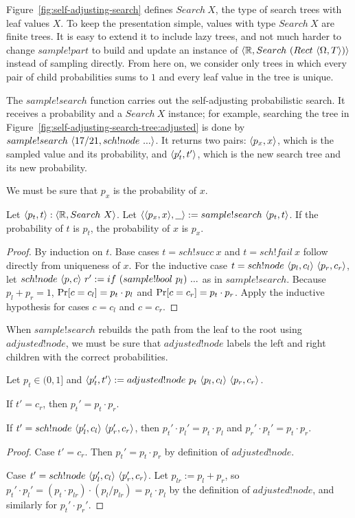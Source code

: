 Figure~\ref{fig:self-adjusting-search} defines $Search~X$, the type of search trees with leaf values $X$.
To keep the presentation simple, values with type $Search~X$ are finite trees.
It is easy to extend it to include lazy trees, and not much harder to change $sample!part$ to build and update an instance of $\langle{\mathbb{R},Search~(Rect~\langle{\Omega,T}\rangle)}\rangle$ instead of sampling directly.
From here on, we consider only trees in which every pair of child probabilities sums to $1$ and every leaf value in the tree is unique.

The $sample!search$ function carries out the self-adjusting probabilistic search.
It receives a probability and a $Search~X$ instance; for example, searching the tree in Figure~\ref{fig:self-adjusting-search-tree:adjusted} is done by $sample!search~\langle{17{/}21,sch!node~...}\rangle$.
It returns two pairs: $\langle{p_x,x}\rangle$, which is the sampled value and its probability, and $\langle{p_t',t'}\rangle$, which is the new search tree and its new probability.

We must be sure that $p_x$ is the probability of $x$.

\begin{theorem}
Let $\langle{p_t,t}\rangle : \langle{\mathbb{R},Search~X}\rangle$.
Let $\langle{\langle{p_x,x}\rangle,\underbar{ }\underbar{ }}\rangle := sample!search~\langle{p_t,t}\rangle$.
If the probability of $t$ is $p_t$, the probability of $x$ is $p_x$.
\end{theorem}
\begin{proof}
By induction on $t$. Base cases $t = sch!succ~x$ and $t = sch!fail~x$ follow directly from uniqueness of $x$.
For the inductive case $t = sch!node~\langle{p_l,c_l}\rangle~\langle{p_r,c_r}\rangle$, let $sch!node~\langle{p,c}\rangle~r' := if~(sample!bool~p_l)~...$ as in $sample!search$.
Because $p_l + p_r = 1$, $\mathrm{Pr}\!\left[{c = c_l}\right] = p_t \cdot p_l$ and $\mathrm{Pr}\!\left[{c = c_r}\right] = p_t \cdot p_r$.
Apply the inductive hypothesis for cases $c = c_l$ and $c = c_r$.
\end{proof}

When $sample!search$ rebuilds the path from the leaf to the root using $adjusted!node$, we must be sure that $adjusted!node$ labels the left and right children with the correct probabilities.

\begin{theorem}
\label{thm:adjusted-node-correct}
Let $p_t \in (0,1]$ and $\langle{p_t',t'}\rangle := adjusted!node~p_t~\langle{p_l,c_l}\rangle~\langle{p_r,c_r}\rangle$.

If $t' = c_r$, then $p_t' = p_t \cdot p_r$.

If $t' = sch!node~\langle{p_l',c_l}\rangle~\langle{p_r',c_r}\rangle$, then $p_t' \cdot p_l' = p_t \cdot p_l$ and $p_r' \cdot p_t' = p_t \cdot p_r$.
\end{theorem}
\begin{proof}
Case $t' = c_r$. Then $p_t' = p_t \cdot p_r$ by definition of $adjusted!node$.

Case $t' = sch!node~\langle{p_l',c_l}\rangle~\langle{p_r',c_r}\rangle$.
Let $p_{lr} := p_l + p_r$, so $p_t' \cdot p_l' = (p_t \cdot p_{lr}) \cdot (p_l {/} p_{lr}) = p_t \cdot p_l$ by the definition of $adjusted!node$, and similarly for $p_t' \cdot p_r'$.
\end{proof}


